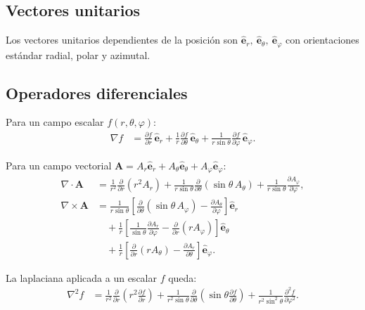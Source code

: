 \subsection*{Vectores unitarios}
Los vectores unitarios dependientes de la posición son \(\hat{\mathbf{e}}_{r},\ \hat{\mathbf{e}}_{\theta},\ \hat{\mathbf{e}}_{\varphi}\) con orientaciones estándar radial, polar y azimutal.

\subsection*{Operadores diferenciales}
Para un campo escalar \(f(r,\theta,\varphi)\):
\begin{align}
\nabla f &= \frac{\partial f}{\partial r}\,\hat{\mathbf{e}}_{r}
          + \frac{1}{r}\frac{\partial f}{\partial \theta}\,\hat{\mathbf{e}}_{\theta}
          + \frac{1}{r\sin\theta}\frac{\partial f}{\partial \varphi}\,\hat{\mathbf{e}}_{\varphi}.
\end{align}

Para un campo vectorial \(\mathbf{A}=A_{r}\hat{\mathbf{e}}_{r}+A_{\theta}\hat{\mathbf{e}}_{\theta}+A_{\varphi}\hat{\mathbf{e}}_{\varphi}\):
\begin{align}
\nabla\cdot\mathbf{A}
&= \frac{1}{r^{2}}\frac{\partial}{\partial r}\!\left(r^{2}A_{r}\right)
 + \frac{1}{r\sin\theta}\frac{\partial}{\partial \theta}\!\left(\sin\theta\,A_{\theta}\right)
 + \frac{1}{r\sin\theta}\frac{\partial A_{\varphi}}{\partial \varphi},\\[6pt]
\nabla\times\mathbf{A}
&= \frac{1}{r\sin\theta}\left[
    \frac{\partial}{\partial \theta}\!\left(\sin\theta\,A_{\varphi}\right)
    - \frac{\partial A_{\theta}}{\partial \varphi}
  \right]\hat{\mathbf{e}}_{r}\nonumber\\
&\quad + \frac{1}{r}\left[
    \frac{1}{\sin\theta}\frac{\partial A_{r}}{\partial \varphi}
    - \frac{\partial}{\partial r}\!\left(r A_{\varphi}\right)
  \right]\hat{\mathbf{e}}_{\theta}\nonumber\\
&\quad + \frac{1}{r}\left[
    \frac{\partial}{\partial r}\!\left(r A_{\theta}\right)
    - \frac{\partial A_{r}}{\partial \theta}
  \right]\hat{\mathbf{e}}_{\varphi}.
\end{align}

La laplaciana aplicada a un escalar \(f\) queda:
\begin{align}
\nabla^{2} f
&= \frac{1}{r^{2}}\frac{\partial}{\partial r}\!\left(r^{2}\frac{\partial f}{\partial r}\right)
 + \frac{1}{r^{2}\sin\theta}\frac{\partial}{\partial \theta}\!\left(\sin\theta\frac{\partial f}{\partial \theta}\right)
 + \frac{1}{r^{2}\sin^{2}\theta}\frac{\partial^{2} f}{\partial \varphi^{2}}.
\end{align}